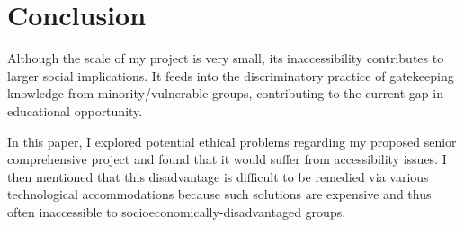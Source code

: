 \documentclass[10pt,twocolumn]{article}
\begin{document}
\section{Conclusion}
    Although the scale of my project is very small, its inaccessibility contributes to larger social implications. It feeds into the discriminatory practice of gatekeeping knowledge from minority/vulnerable groups, contributing to the current gap in educational opportunity.

    In this paper, I explored potential ethical problems regarding my proposed senior comprehensive project and found that it would suffer from accessibility issues. I then mentioned that this disadvantage is difficult to be remedied via various technological accommodations because such solutions are expensive and thus often inaccessible to socioeconomically-disadvantaged groups.

\printbibliography 
\end{document}
